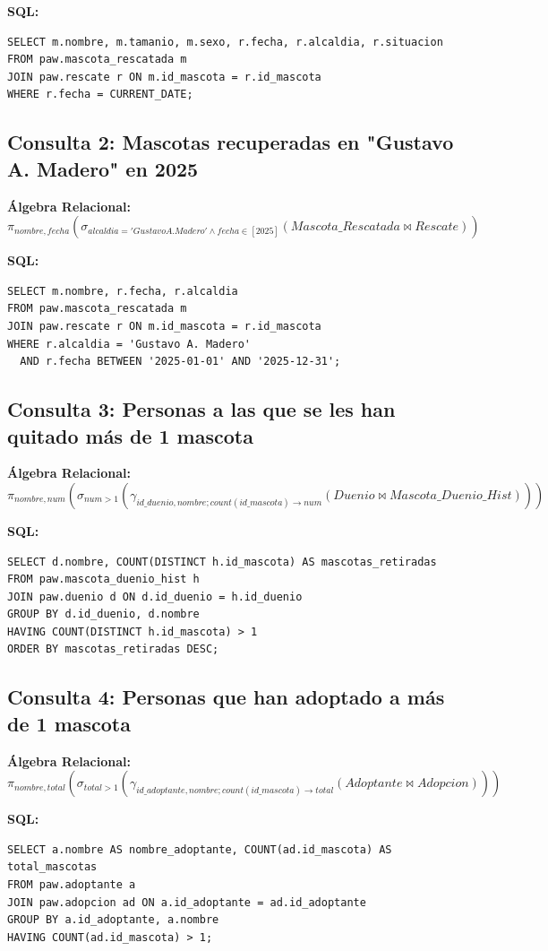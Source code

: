 \documentclass[12pt,a4paper]{article}
\begin{document}
\textbf{SQL:}
\begin{lstlisting}
SELECT m.nombre, m.tamanio, m.sexo, r.fecha, r.alcaldia, r.situacion
FROM paw.mascota_rescatada m
JOIN paw.rescate r ON m.id_mascota = r.id_mascota
WHERE r.fecha = CURRENT_DATE;
\end{lstlisting}

\subsection*{Consulta 2: Mascotas recuperadas en "Gustavo A. Madero" en 2025}

\textbf{Álgebra Relacional:}
\[
\pi_{nombre, fecha} (\sigma_{alcaldia='Gustavo A. Madero' \land fecha \in [2025]} (Mascota\_Rescatada \bowtie Rescate))
\]

\textbf{SQL:}
\begin{lstlisting}
SELECT m.nombre, r.fecha, r.alcaldia
FROM paw.mascota_rescatada m
JOIN paw.rescate r ON m.id_mascota = r.id_mascota
WHERE r.alcaldia = 'Gustavo A. Madero' 
  AND r.fecha BETWEEN '2025-01-01' AND '2025-12-31';
\end{lstlisting}

\subsection*{Consulta 3: Personas a las que se les han quitado más de 1 mascota}

\textbf{Álgebra Relacional:}
\[
\pi_{nombre, num} (\sigma_{num > 1} (\gamma_{id\_duenio, nombre; count(id\_mascota)\to num} (Duenio \bowtie Mascota\_Duenio\_Hist)))
\]

\textbf{SQL:}
\begin{lstlisting}
SELECT d.nombre, COUNT(DISTINCT h.id_mascota) AS mascotas_retiradas
FROM paw.mascota_duenio_hist h
JOIN paw.duenio d ON d.id_duenio = h.id_duenio
GROUP BY d.id_duenio, d.nombre
HAVING COUNT(DISTINCT h.id_mascota) > 1
ORDER BY mascotas_retiradas DESC;
\end{lstlisting}

\subsection*{Consulta 4: Personas que han adoptado a más de 1 mascota}

\textbf{Álgebra Relacional:}
\[
\pi_{nombre, total} (\sigma_{total > 1} (\gamma_{id\_adoptante, nombre; count(id\_mascota)\to total} (Adoptante \bowtie Adopcion)))
\]

\textbf{SQL:}
\begin{lstlisting}
SELECT a.nombre AS nombre_adoptante, COUNT(ad.id_mascota) AS total_mascotas
FROM paw.adoptante a
JOIN paw.adopcion ad ON a.id_adoptante = ad.id_adoptante
GROUP BY a.id_adoptante, a.nombre
HAVING COUNT(ad.id_mascota) > 1;
\end{lstlisting}
\end{document}
